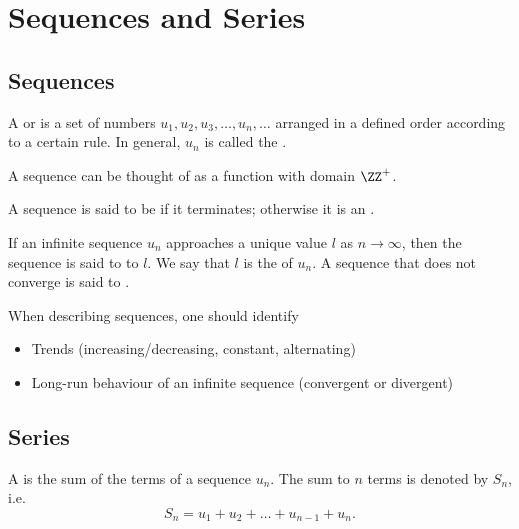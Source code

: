 \chapter{Sequences and Series}\label{chap:Sequences-and-Series}

\section{Sequences}

\begin{definition}
    A  or  is a set of numbers $u_1, u_2, u_3, \dots, u_n, \dots$ arranged in a defined order according to a certain rule. In general, $u_n$ is called the .
\end{definition}

\begin{remark}
    A sequence can be thought of as a function with domain $\ZZ^+$.
\end{remark}

\begin{definition}
    A sequence is said to be  if it terminates; otherwise it is an .
\end{definition}

\begin{definition}
    If an infinite sequence $u_n$ approaches a unique value $l$ as $n \to \infty$, then the sequence is said to  to $l$. We say that $l$ is the  of $u_n$. A sequence that does not converge is said to .
\end{definition}

When describing sequences, one should identify
\begin{itemize}
    \item Trends (increasing/decreasing, constant, alternating)
    \item Long-run behaviour of an infinite sequence (convergent or divergent)
\end{itemize}

\section{Series}

\begin{definition}
    A  is the sum of the terms of a sequence $u_n$. The sum to $n$ terms is denoted by $S_n$, i.e. \[S_n = u_1 + u_2 + \dots + u_{n-1} + u_n.\]
\end{definition}

